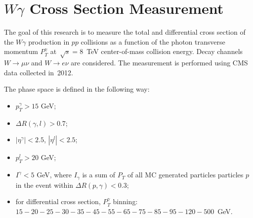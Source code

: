 \chapter{$W\gamma$ Cross Section Measurement}
\label{sec:AN_WgMeas}

The goal of this research is to measure the total and differential cross section of the $W\gamma$ production in $pp$ collisions as a function of the photon transverse momentum $P_T^\gamma$ at~$\sqrt{s}=8$~TeV center-of-mass collision energy. Decay channels $W\rightarrow\mu\nu$ and $W\rightarrow e\nu$ are considered. The measurement is performed using CMS data collected in~2012.

The phase space is defined in the following way:
\begin{itemize}
  \item $p_T^{\gamma}>15$ GeV;
  \item $\Delta{R}(\gamma,l) > 0.7$;
  \item $|\eta^{\gamma}|<2.5$, $|\eta^{l}|<2.5$;
  \item $p_T^{l}>20$ GeV;
  \item $I^{\gamma}<5$ GeV, where $I_{\gamma}$ is a sum of $P_T$ of all MC generated particles particles $p$ in the event within $\Delta{R(p,\gamma)}<0.3$;
  \item for differential cross section, $P_T^{\gamma}$ binning: $15-20-25-30-35-45-55-65-75-85-95-120-500$~GeV.
\end{itemize}
